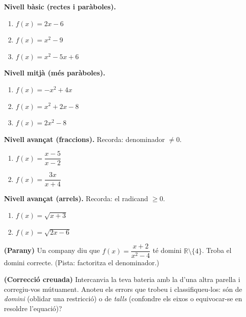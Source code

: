 \begin{exercicis}
\begin{exlist}
  \item \textbf{Nivell bàsic (rectes i paràboles).}
    \begin{enumerate}[label=\alph*), leftmargin=1.6em, topsep=2pt]
      \item $f(x)=2x-6$
      \item $f(x)=x^2-9$
      \item $f(x)=x^2-5x+6$
    \end{enumerate}
  \item \textbf{Nivell mitjà (més paràboles).}
    \begin{enumerate}[label=\alph*), leftmargin=1.6em, topsep=2pt]
      \item $f(x)=-x^2+4x$
      \item $f(x)=x^2+2x-8$
      \item $f(x)=2x^2-8$
    \end{enumerate}
  \item \textbf{Nivell avançat (fraccions).} Recorda: denominador $\neq 0$.
    \begin{enumerate}[label=\alph*), leftmargin=1.6em, topsep=2pt]
      \item $f(x)=\dfrac{x-5}{x-2}$
      \item $f(x)=\dfrac{3x}{x+4}$
    \end{enumerate}
  \item \textbf{Nivell avançat (arrels).} Recorda: el radicand $\ge 0$.
    \begin{enumerate}[label=\alph*), leftmargin=1.6em, topsep=2pt]
      \item $f(x)=\sqrt{x+3}$
      \item $f(x)=\sqrt{2x-6}$
    \end{enumerate}
  \item \textbf{(Parany)} Un company diu que $f(x)=\dfrac{x+2}{x^2-4}$ té domini
        $\mathbb{R}\setminus\{4\}$. Troba el domini correcte. (Pista: factoritza el
        denominador.)
  \item \textbf{(Correcció creuada)} Intercanvia la teva bateria amb la d'una altra
        parella i corregiu-vos mútuament. Anoteu els errors que trobeu i classifiqueu-los:
        són de \emph{domini} (oblidar una restricció) o de \emph{talls} (confondre els
        eixos o equivocar-se en resoldre l'equació)?
\end{exlist}
\end{exercicis}

